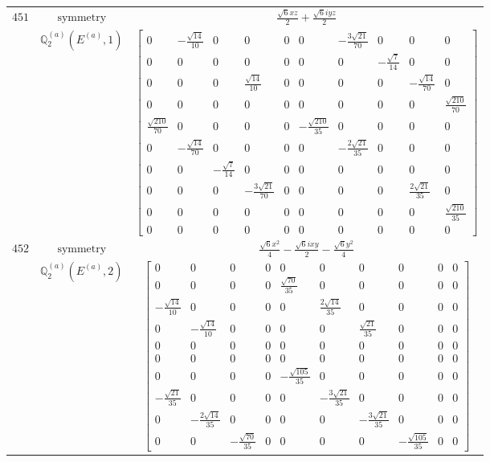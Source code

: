 \documentclass[fleqn,8pt,landscape]{jsarticle}
\begin{document}
\begin{longtable}{ccc}
$ 451 $ & $ \text{symmetry} $ & $ \frac{\sqrt{6} x z}{2} + \frac{\sqrt{6} i y z}{2} $ \\
$  $ & $ \mathbb{Q}_{2}^{(a)}(E^{(a)},1) $ & $ \begin{bmatrix} 0 & - \frac{\sqrt{14}}{10} & 0 & 0 & 0 & 0 & - \frac{3 \sqrt{21}}{70} & 0 & 0 & 0 \\ 0 & 0 & 0 & 0 & 0 & 0 & 0 & - \frac{\sqrt{7}}{14} & 0 & 0 \\ 0 & 0 & 0 & \frac{\sqrt{14}}{10} & 0 & 0 & 0 & 0 & - \frac{\sqrt{14}}{70} & 0 \\ 0 & 0 & 0 & 0 & 0 & 0 & 0 & 0 & 0 & \frac{\sqrt{210}}{70} \\ \frac{\sqrt{210}}{70} & 0 & 0 & 0 & 0 & - \frac{\sqrt{210}}{35} & 0 & 0 & 0 & 0 \\ 0 & - \frac{\sqrt{14}}{70} & 0 & 0 & 0 & 0 & - \frac{2 \sqrt{21}}{35} & 0 & 0 & 0 \\ 0 & 0 & - \frac{\sqrt{7}}{14} & 0 & 0 & 0 & 0 & 0 & 0 & 0 \\ 0 & 0 & 0 & - \frac{3 \sqrt{21}}{70} & 0 & 0 & 0 & 0 & \frac{2 \sqrt{21}}{35} & 0 \\ 0 & 0 & 0 & 0 & 0 & 0 & 0 & 0 & 0 & \frac{\sqrt{210}}{35} \\ 0 & 0 & 0 & 0 & 0 & 0 & 0 & 0 & 0 & 0 \end{bmatrix} $ \\ \hline
$ 452 $ & $ \text{symmetry} $ & $ \frac{\sqrt{6} x^{2}}{4} - \frac{\sqrt{6} i x y}{2} - \frac{\sqrt{6} y^{2}}{4} $ \\
$  $ & $ \mathbb{Q}_{2}^{(a)}(E^{(a)},2) $ & $ \begin{bmatrix} 0 & 0 & 0 & 0 & 0 & 0 & 0 & 0 & 0 & 0 \\ 0 & 0 & 0 & 0 & \frac{\sqrt{70}}{35} & 0 & 0 & 0 & 0 & 0 \\ - \frac{\sqrt{14}}{10} & 0 & 0 & 0 & 0 & \frac{2 \sqrt{14}}{35} & 0 & 0 & 0 & 0 \\ 0 & - \frac{\sqrt{14}}{10} & 0 & 0 & 0 & 0 & \frac{\sqrt{21}}{35} & 0 & 0 & 0 \\ 0 & 0 & 0 & 0 & 0 & 0 & 0 & 0 & 0 & 0 \\ 0 & 0 & 0 & 0 & 0 & 0 & 0 & 0 & 0 & 0 \\ 0 & 0 & 0 & 0 & - \frac{\sqrt{105}}{35} & 0 & 0 & 0 & 0 & 0 \\ - \frac{\sqrt{21}}{35} & 0 & 0 & 0 & 0 & - \frac{3 \sqrt{21}}{35} & 0 & 0 & 0 & 0 \\ 0 & - \frac{2 \sqrt{14}}{35} & 0 & 0 & 0 & 0 & - \frac{3 \sqrt{21}}{35} & 0 & 0 & 0 \\ 0 & 0 & - \frac{\sqrt{70}}{35} & 0 & 0 & 0 & 0 & - \frac{\sqrt{105}}{35} & 0 & 0 \end{bmatrix} $ \\ \hline

\end{longtable}
\end{document}
